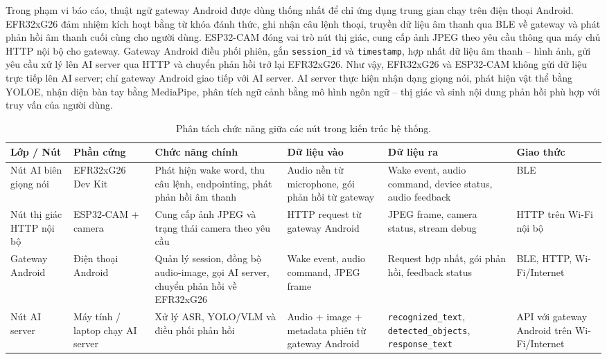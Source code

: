 \documentclass[11pt,a4paper]{article}
\begin{document}
Trong phạm vi báo cáo, thuật ngữ gateway Android được dùng thống nhất để chỉ ứng dụng trung gian chạy trên điện thoại Android. EFR32xG26 đảm nhiệm kích hoạt bằng từ khóa đánh thức, ghi nhận câu lệnh thoại, truyền dữ liệu âm thanh qua BLE về gateway và phát phản hồi âm thanh cuối cùng cho người dùng. ESP32-CAM đóng vai trò nút thị giác, cung cấp ảnh JPEG theo yêu cầu thông qua máy chủ HTTP nội bộ cho gateway. Gateway Android điều phối phiên, gắn \texttt{session\_id} và \texttt{timestamp}, hợp nhất dữ liệu âm thanh -- hình ảnh, gửi yêu cầu xử lý lên AI server qua HTTP và chuyển phản hồi trở lại EFR32xG26. Như vậy, EFR32xG26 và ESP32-CAM không gửi dữ liệu trực tiếp lên AI server; chỉ gateway Android giao tiếp với AI server. AI server thực hiện nhận dạng giọng nói, phát hiện vật thể bằng YOLOE, nhận diện bàn tay bằng MediaPipe, phân tích ngữ cảnh bằng mô hình ngôn ngữ -- thị giác và sinh nội dung phản hồi phù hợp với truy vấn của người dùng.

\begin{table}[H]
\centering
\caption{Phân tách chức năng giữa các nút trong kiến trúc hệ thống.}
\footnotesize
\setlength{\tabcolsep}{3pt}
\begin{tabularx}{\textwidth}{%
>{\hsize=0.80\hsize\RaggedRight\arraybackslash}X%
>{\hsize=0.80\hsize\RaggedRight\arraybackslash}X%
>{\hsize=1.25\hsize\RaggedRight\arraybackslash}X%
>{\hsize=0.95\hsize\RaggedRight\arraybackslash}X%
>{\hsize=1.20\hsize\RaggedRight\arraybackslash}X%
>{\hsize=1.00\hsize\RaggedRight\arraybackslash}X}
\toprule
\textbf{Lớp / Nút} & \textbf{Phần cứng} & \textbf{Chức năng chính} & \textbf{Dữ liệu vào} & \textbf{Dữ liệu ra} & \textbf{Giao thức} \\
\midrule
Nút AI biên giọng nói & EFR32xG26 Dev Kit & Phát hiện wake word, thu câu lệnh, endpointing, phát phản hồi âm thanh & Audio nền từ microphone, gói phản hồi từ gateway & Wake event, audio command, device status, audio feedback & BLE \\
Nút thị giác HTTP nội bộ & ESP32-CAM + camera & Cung cấp ảnh JPEG và trạng thái camera theo yêu cầu & HTTP request từ gateway Android & JPEG frame, camera status, stream debug & HTTP trên Wi-Fi nội bộ \\
Gateway Android & Điện thoại Android & Quản lý session, đồng bộ audio-image, gọi AI server, chuyển phản hồi về EFR32xG26 & Wake event, audio command, JPEG frame & Request hợp nhất, gói phản hồi, feedback status & BLE, HTTP, Wi-Fi/Internet \\
Nút AI server & Máy tính / laptop chạy AI server & Xử lý ASR, YOLO/VLM và điều phối phản hồi & Audio + image + metadata phiên từ gateway Android & \texttt{recognized\_text}, \texttt{detected\_objects}, \texttt{response\_text} & API với gateway Android trên Wi-Fi/Internet \\
\bottomrule
\end{tabularx}
\end{table}
\end{document}
